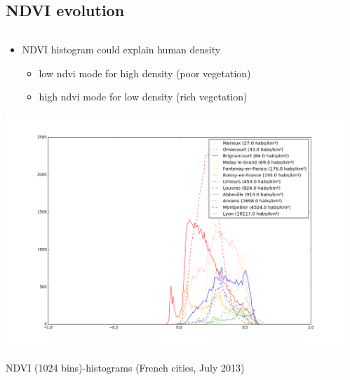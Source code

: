 \documentclass[c]{beamer}
\begin{document}
\subsection{NDVI evolution}
\begin{frame}

\begin{columns}
 \begin{column}{0.75\textwidth}
 
 \begin{overlayarea}{\linewidth}{2cm}
 \begin{itemize}
 \item NDVI histogram could explain human density
 \begin{itemize}
  \item \scriptsize low ndvi mode for high density (poor vegetation)
  \item \scriptsize high ndvi mode for low density (rich vegetation)
 \end{itemize}
 \end{itemize}
 \end{overlayarea}

  \begin{overlayarea}{\linewidth}{4.5cm}
  \centering\vfill
  \includegraphics[scale=0.17]{images/ndvi/ndvi_categorie.png}
  \end{overlayarea}
  \begin{overlayarea}{\linewidth}{0.5cm}
  \centering
  \tiny NDVI (1024 bins)-histograms (French cities, July 2013) \par
  \end{overlayarea}
  
 \end{column}
 \begin{column}{0.25\textwidth}
 

\end{column}
\end{columns}
\end{frame}
\end{document}
